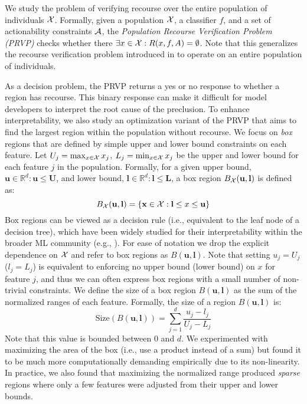 We study the problem of verifying recourse over the entire population of individuals ${\cal X}$. Formally, given a population ${\cal X}$, a classifier $f$, and a set of actionability constraints ${\cal A}$, the \textit{Population Recourse Verification Problem (PRVP) } checks whether there $\exists x \in {\cal X}: R(x, f, A) = \emptyset$. Note that this generalizes the recourse verification problem introduced in \citet{kothari2023prediction} to operate on an entire population of individuals. 

As a decision problem, the PRVP returns a yes or no response to whether a region has recourse. This binary response can make it difficult for model developers to interpret the root cause of the preclusion. To enhance interpretability, we also study an optimization variant of the PRVP that aims to find the largest region within the population without recourse. We focus on \textit{box} regions that are defined by simple upper and lower bound constraints on each feature. Let $U_j = \max_{x \in {\cal X}}x_j$, $L_j = \min_{x \in {\cal X}}x_j$ be the upper and lower bound for each feature $j$ in the population. Formally, for a given upper bound, $\mathbf{u} \in \mathbb{R}^d: \mathbf{u} \leq \mathbf{U}$, and lower bound, $\mathbf{l} \in \mathbb{R}^d: \mathbf{l} \leq \mathbf{L}$, a box region $B_{\cal X}(\mathbf{u},\mathbf{l})$ is defined as:
$$
B_{\cal X}(\mathbf{u},\mathbf{l}) = \{\mathbf{x} \in {\cal X}: \mathbf{l} \leq x \leq \mathbf{u}\}
$$
Box regions can be viewed as a decision rule (i.e., equivalent to the leaf node of a decision tree), which have been widely studied for their interpretability within the broader ML community (e.g., \cite{lawless2023interpretable, lawless2022interpretable, lawless2023cluster}).
For ease of notation we drop the explicit dependence on ${\cal X}$ and refer to box regions as $B(\mathbf{u}, \mathbf{l})$.
Note that setting $u_j = U_j$ ($l_j = L_j$) is equivalent to enforcing no upper bound (lower bound) on $x$ for feature $j$, and thus we can often express box regions with a small number of non-trivial constraints. We define the size of a box region $B(\mathbf{u},\mathbf{l})$ as the sum of the normalized ranges of each feature. Formally, the size of a region $B(\mathbf{u},\mathbf{l})$ is: $$\text{Size}(B(\mathbf{u}, \mathbf{l})) = \sum_{j=1}^d \frac{u_j - l_j}{U_j - L_j}$$ Note that this value is bounded between $0$ and $d$. We experimented with maximizing the area of the box (i.e., use a product instead of a sum) but found it to be much more computationally demanding empirically due to its non-linearity. In practice, we also found that maximizing the normalized range produced \emph{sparse} regions where only a few features were adjusted from their upper and lower bounds.

